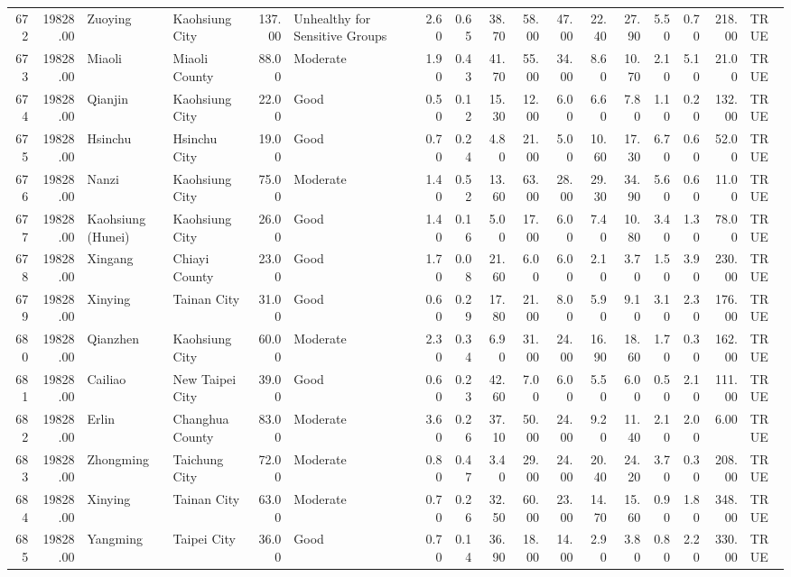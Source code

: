 \begin{table}[ht]
\begin{tabular}{rrllrlrrrrrrrrrrl}
  672 & 19828.00 & Zuoying & Kaohsiung City & 137.00 & Unhealthy for Sensitive Groups & 2.60 & 0.65 & 38.70 & 58.00 & 47.00 & 22.40 & 27.90 & 5.50 & 0.70 & 218.00 & TRUE \\ 
  673 & 19828.00 & Miaoli & Miaoli County & 88.00 & Moderate & 1.90 & 0.43 & 41.70 & 55.00 & 34.00 & 8.60 & 10.70 & 2.10 & 5.10 & 21.00 & TRUE \\ 
  674 & 19828.00 & Qianjin & Kaohsiung City & 22.00 & Good & 0.50 & 0.12 & 15.30 & 12.00 & 6.00 & 6.60 & 7.80 & 1.10 & 0.20 & 132.00 & TRUE \\ 
  675 & 19828.00 & Hsinchu & Hsinchu City & 19.00 & Good & 0.70 & 0.24 & 4.80 & 21.00 & 5.00 & 10.60 & 17.30 & 6.70 & 0.60 & 52.00 & TRUE \\ 
  676 & 19828.00 & Nanzi & Kaohsiung City & 75.00 & Moderate & 1.40 & 0.52 & 13.60 & 63.00 & 28.00 & 29.30 & 34.90 & 5.60 & 0.60 & 11.00 & TRUE \\ 
  677 & 19828.00 & Kaohsiung (Hunei) & Kaohsiung City & 26.00 & Good & 1.40 & 0.16 & 5.00 & 17.00 & 6.00 & 7.40 & 10.80 & 3.40 & 1.30 & 78.00 & TRUE \\ 
  678 & 19828.00 & Xingang & Chiayi County & 23.00 & Good & 1.70 & 0.08 & 21.60 & 6.00 & 6.00 & 2.10 & 3.70 & 1.50 & 3.90 & 230.00 & TRUE \\ 
  679 & 19828.00 & Xinying & Tainan City & 31.00 & Good & 0.60 & 0.29 & 17.80 & 21.00 & 8.00 & 5.90 & 9.10 & 3.10 & 2.30 & 176.00 & TRUE \\ 
  680 & 19828.00 & Qianzhen & Kaohsiung City & 60.00 & Moderate & 2.30 & 0.34 & 6.90 & 31.00 & 24.00 & 16.90 & 18.60 & 1.70 & 0.30 & 162.00 & TRUE \\ 
  681 & 19828.00 & Cailiao & New Taipei City & 39.00 & Good & 0.60 & 0.23 & 42.60 & 7.00 & 6.00 & 5.50 & 6.00 & 0.50 & 2.10 & 111.00 & TRUE \\ 
  682 & 19828.00 & Erlin & Changhua County & 83.00 & Moderate & 3.60 & 0.26 & 37.10 & 50.00 & 24.00 & 9.20 & 11.40 & 2.10 & 2.00 & 6.00 & TRUE \\ 
  683 & 19828.00 & Zhongming & Taichung City & 72.00 & Moderate & 0.80 & 0.47 & 3.40 & 29.00 & 24.00 & 20.40 & 24.20 & 3.70 & 0.30 & 208.00 & TRUE \\ 
  684 & 19828.00 & Xinying & Tainan City & 63.00 & Moderate & 0.70 & 0.26 & 32.50 & 60.00 & 23.00 & 14.70 & 15.60 & 0.90 & 1.80 & 348.00 & TRUE \\ 
  685 & 19828.00 & Yangming & Taipei City & 36.00 & Good & 0.70 & 0.14 & 36.90 & 18.00 & 14.00 & 2.90 & 3.80 & 0.80 & 2.20 & 330.00 & TRUE \\ 

\end{tabular}
\end{table}
